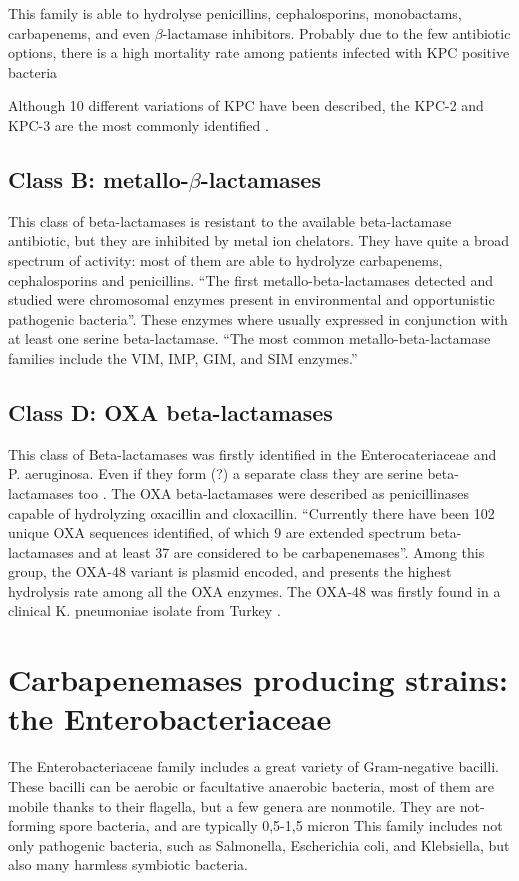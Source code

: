 \documentclass[11pt]{report}
\begin{document}
This family is able to hydrolyse penicillins, cephalosporins, monobactams, carbapenems, and even $\beta$-lactamase inhibitors. Probably due to the few antibiotic options, there is a high mortality rate among patients infected with KPC positive bacteria \cite{MunozPrice2013}
                   
Although 10 different variations of KPC have been described, the KPC-2 and KPC-3 are the most commonly identified \cite{WaltherRasmussen2007}.



\section {Class B: metallo-$\beta$-lactamases}
This class of beta-lactamases is resistant to the available beta-lactamase antibiotic, but they are inhibited by metal ion chelators.
They have quite a broad spectrum of activity: most of them are able to hydrolyze carbapenems, cephalosporins and penicillins.
“The first metallo-beta-lactamases detected and studied were chromosomal enzymes present in environmental and opportunistic pathogenic bacteria”.
These enzymes where usually expressed in conjunction with at least one serine beta-lactamase.
“The most common metallo-beta-lactamase families include the VIM, IMP, GIM, and SIM enzymes.”
\cite{Queenan2007}

\section{Class D: OXA beta-lactamases}
This class of Beta-lactamases was firstly identified in the Enterocateriaceae and P. aeruginosa.
Even if they form (?) a separate class they are serine beta-lactamases too .
The OXA beta-lactamases were described as penicillinases capable of hydrolyzing oxacillin and cloxacillin.
“Currently there have been 102 unique OXA sequences identified, of which 9 are extended spectrum beta-lactamases and at least 37 are considered to be carbapenemases”.
Among this group, the OXA-48 variant is plasmid encoded, and presents the highest hydrolysis rate among all the OXA enzymes.
The OXA-48 was firstly found in a clinical K. pneumoniae isolate from Turkey \cite{Poirel2012}.


\chapter{Carbapenemases producing strains: the Enterobacteriaceae}
The Enterobacteriaceae family includes a great variety of Gram-negative bacilli. These bacilli can be aerobic or facultative anaerobic bacteria, most of them are mobile thanks to their flagella, but a few genera are nonmotile. They are not-forming spore bacteria, and are typically 0,5-1,5 micron 
This family includes not only pathogenic bacteria, such as Salmonella, Escherichia coli, and Klebsiella, but also many harmless symbiotic bacteria.
\end{document}
